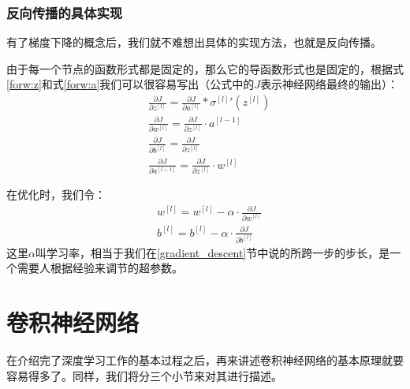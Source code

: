 \documentclass[UTF8]{ctexart}
\begin{document}
    			
    		\subsubsection{反向传播的具体实现}
    			\indent 有了梯度下降的概念后，我们就不难想出具体的实现方法，也就是反向传播。
    			
    			\indent 由于每一个节点的函数形式都是固定的，那么它的导函数形式也是固定的，根据式\ref{forw:z}和式\ref{forw:a}我们可以很容易写出（公式中的$J$表示神经网络最终的输出）：
    			\begin{align}
    			&\frac{\partial J}{ \partial {{z}^{[l]}} }=\frac{\partial J}{\partial {{a}^{[l]}}}*{{\sigma}^{[l]}}'( {{z}^{[l]}})  \\
    			&\frac{\partial J}{\partial {{w}^{[l]}}}=\frac{\partial J}{\partial {{z}^{[l]}}}\cdot{{a}^{[l-1]}} \\
    			&\frac{\partial J}{\partial {{b}^{[l]}}}=\frac{\partial J}{\partial {{z}^{[l]}}} \\
    			&\frac{\partial J}{\partial {{a}^{[l-1]}}}= \frac{\partial J}{\partial {{z}^{[l]}}} \cdot {{w}^{\left[ l \right]}}
    		    \end{align}
    			
    			\indent 在优化时，我们令：
    			\begin{align}
    			&w^{[l]}=w^{[l]}-\alpha \cdot \frac{\partial J}{\partial {{w}^{[l]}}} \\
    			&b^{[l]}=b^{[l]}-\alpha \cdot \frac{\partial J}{\partial {{b}^{[l]}}}
    			\end{align}
    			这里$\alpha$叫学习率，相当于我们在\ref{gradient_descent}节中说的所跨一步的步长，是一个需要人根据经验来调节的超参数。
                
    \section{卷积神经网络}\label{cnn}
        
        \indent 在介绍完了深度学习工作的基本过程之后，再来讲述卷积神经网络的基本原理就要容易得多了。同样，我们将分三个小节来对其进行描述。
        
\end{document}

